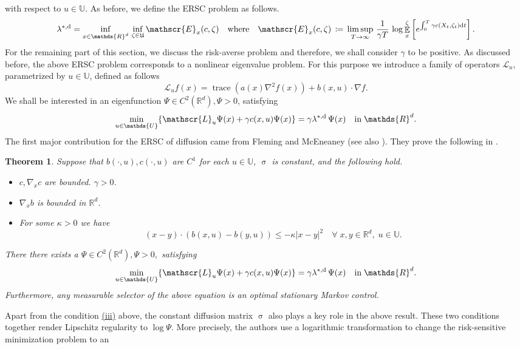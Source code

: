 \documentclass[notitlepage,11pt,reqno]{amsart}
\numberwithin{equation}{section}
\theoremstyle{plain}
\newtheorem{theorem}{Theorem}[section]
\theoremstyle{definition}
\theoremstyle{remark}
\newcommand{\Act}{{\mathds{U}}}
\newcommand{\sE}{{\mathscr{E}}}     %
\newcommand{\sL}{{\mathscr{L}}}
\newcommand{\Uadm}{\mathfrak{U}}
\newcommand{\lamstrdf}{\lambda^{*,{\rm d}}}
\newcommand{\Rd}{{\mathds{R}^{d}}}
\DeclareMathOperator{\Exp}{\mathbb{E}} %
\newcommand{\D}{\mathrm{d}} %
\newcommand{\abs}[1]{\lvert#1\rvert}
\DeclareMathOperator*{\trace}{trace}
\newcommand{\grad}{\nabla}
\newcommand{\df}{\coloneqq}
\begin{document}
with respect to $u\in\Act$. As before, we define the ERSC problem as follows.
\begin{equation}\label{Ergocost}
\lamstrdf= \inf_{x\in\Rd}\,\inf_{\zeta\in\Uadm} \sE_x(c, \zeta) \quad \text{where}\quad \sE_x(c, \zeta) \,\df\, \limsup_{ T\to\infty} \, \frac{1}{\gamma T}\,
\log \Exp_x^{\zeta} \left[e^{\int_{ 0}^{T} \gamma c(X_t, \zeta_t) \D{t}}\right].
\end{equation}
For the remaining part of this section, we discuss the risk-averse problem and therefore, we shall consider $\gamma$ to be positive. As discussed before,
the above ERSC problem corresponds to a nonlinear eigenvalue problem. For this purpose we introduce a family of operators $\sL_u$, parametrized by $u\in\Act$, defined
as follows
$$\sL_u f(x) = \trace(a(x)\grad^2 f(x)) + b(x, u)\cdot\grad f.$$
We shall be interested in an eigenfunction $\Psi\in C^2(\Rd), \Psi>0$, satisfying
\begin{equation}\label{E3.11}
\min_{u\in\Act}\{\sL_u\Psi(x) + \gamma c(x, u)\Psi(x)\}=\gamma\lamstrdf\,\Psi(x)\quad \text{in}\; \Rd.
\end{equation}
The first major contribution for the ERSC of diffusion came from Fleming and McEneaney \cite{Fleming-95a} (see also \cite{Fleming-91}). 
They prove the following in \cite[Theorem~7.2 and ~7.3]{Fleming-95a}.
\begin{theorem}\label{T3.5}
Suppose that $b(\cdot, u), c(\cdot, u)$ are $C^1$ for each $u\in\Act$, $\upsigma$ is constant, and the following hold.
\begin{itemize}
\item[(i)] $c, \nabla_x c$ are bounded. $\gamma>0$.
\item[(ii)] $\grad_x b$ is bounded in $\Rd$.
\item[\hypertarget{iii}{(iii)}] For some $\kappa>0$ we have
$$(x-y)\cdot (b(x, u)-b(y, u))\leq -\kappa \abs{x-y}^2\quad \forall\; x, y\in\Rd, \; u\in\Act.$$
\end{itemize}
There there exists a $\Psi\in C^2(\Rd), \Psi>0,$ satisfying 
$$\min_{u\in\Act}\{\sL_u\Psi(x) + \gamma c(x, u)\Psi(x)\}=\gamma\lamstrdf\,\Psi(x)\quad \text{in}\; \Rd.$$
Furthermore, any measurable selector of the above equation is an optimal stationary Markov control.
\end{theorem}
Apart from the condition \hyperlink{iii}{(iii)} above, the constant diffusion matrix $\upsigma$ also plays a key role in the above result. These two conditions together render 
Lipschitz regularity to $\log\Psi$. More precisely, the authors use a logarithmic transformation to change the risk-sensitive minimization problem to an 
\end{document}
